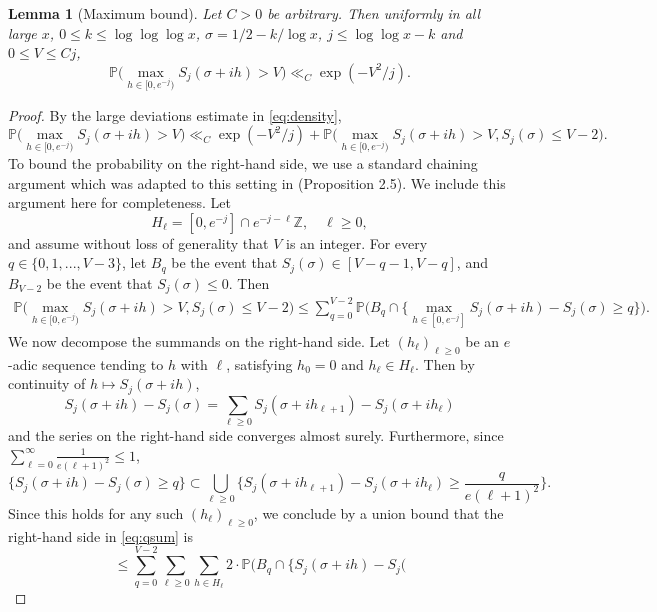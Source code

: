 \documentclass{amsart}
\newtheorem{lemma}[theorem]{Lemma}
\theoremstyle{definition}
\theoremstyle{remark}
\numberwithin{equation}{section}
\begin{document}
\begin{lemma}[Maximum bound]\label{lem:chaining} Let $C>0$ be arbitrary. Then uniformly in all large $x$, $0\leq k\leq \log\log\log x$, $\sigma=1/2-k/\log x$, $j\leq \log\log x-k$ and $0\leq V\leq Cj$,
    \begin{equation}\label{eq:maximumbound}
                \mathbb{P}\Big(\max_{h\in [0,e^{-j})}S_j(\sigma+ih)>V\Big)\ll_C \exp(-V^2/j).
    \end{equation}
\end{lemma}
\begin{proof} 
 By the large deviations estimate in \eqref{eq:density}, 
    \[
        \mathbb{P}\Big(\max_{h\in [0,e^{-j})}S_j(\sigma+ih)>V\Big)\ll_C \exp(-V^2/j)+\mathbb{P}\Big(\max_{h\in [0,e^{-j})}S_j(\sigma+ih)>V, S_j(\sigma)\leq V-2\Big).
    \]
    To bound the probability on the right-hand side, we use a standard chaining argument which was  adapted to this setting in \cite{ABH} (Proposition 2.5). We include this argument here for completeness.
    Let $$H_\ell=[0,e^{-j}]\cap e^{-j-\ell}\mathbb{Z}, \quad\ell\geq 0,$$ and assume without loss of generality that $V$ is an integer. For every $q\in \{0,1,...,V-3\}$, let $B_q$ be the event that $S_j(\sigma)\in [V-q-1,V-q]$, and $B_{V-2}$ be the event that $S_j(\sigma)\leq 0$. Then
    \begin{align}\label{eq:qsum}
        \mathbb{P}\Big(\max_{h\in [0,e^{-j})}S_j(\sigma+ih)>V, S_j(\sigma)\leq V-2\Big) \leq \sum_{q=0}^{V-2} \mathbb{P}\Big(B_q\cap \Big\{\max_{h\in [0,e^{-j}]}S_j(\sigma+ih)-S_j(\sigma)\geq q\Big\}\Big).
    \end{align}
    We now decompose the summands on the right-hand side. Let $(h_\ell)_{\ell\geq 0}$ be an $e$-adic sequence tending to $h$ with $\ell$, satisfying $h_0=0$ and $h_\ell\in H_{\ell}$. Then by continuity of $h\mapsto S_j(\sigma+ih)$,
    \[
        S_j(\sigma+ih)-S_j(\sigma)=\sum_{\ell\geq 0} S_j(\sigma+ih_{\ell+1})-S_j(\sigma+ih_\ell)
    \]
    and the series on the right-hand side converges almost surely.  Furthermore, since $\sum_{\ell=0}^\infty\frac{1}{e(\ell+1)^2}\leq 1$, 
    \[
        \big\{S_j(\sigma+ih)-S_j(\sigma)\geq q\big\} \subset \bigcup_{\ell\geq 0}\Big\{S_j(\sigma+ih_{\ell+1})-S_j(\sigma+ih_\ell)\geq \frac{q}{e(\ell+1)^2}\Big\}.
    \]
    Since this holds for any such $(h_\ell)_{\ell\geq 0}$, we conclude by a union bound that the right-hand side in \eqref{eq:qsum} is
    \begin{equation}\label{eq:chainingfinal}
        \leq \sum_{q=0}^{V-2}\sum_{\ell\geq 0}\sum_{h\in H_\ell}2\cdot \mathbb{P}\Big(B_q\cap\Big\{ S_j(\sigma+ih)-S_j(

\end{equation}
\end{proof}
\end{document}
